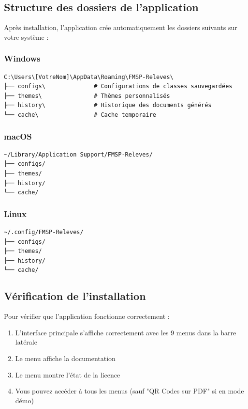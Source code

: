\subsection{Structure des dossiers de l'application}

Après installation, l'application crée automatiquement les dossiers suivants sur votre système :

\subsubsection{Windows}

\begin{verbatim}
C:\Users\[VotreNom]\AppData\Roaming\FMSP-Releves\
├── configs\              # Configurations de classes sauvegardées
├── themes\               # Thèmes personnalisés
├── history\              # Historique des documents générés
└── cache\                # Cache temporaire
\end{verbatim}

\subsubsection{macOS}

\begin{verbatim}
~/Library/Application Support/FMSP-Releves/
├── configs/
├── themes/
├── history/
└── cache/
\end{verbatim}

\subsubsection{Linux}

\begin{verbatim}
~/.config/FMSP-Releves/
├── configs/
├── themes/
├── history/
└── cache/
\end{verbatim}


\subsection{Vérification de l'installation}

Pour vérifier que l'application fonctionne correctement :

\begin{enumerate}[leftmargin=*]
    \item L'interface principale s'affiche correctement avec les 9 menus dans la barre latérale
    \item Le menu \menu{Aide} affiche la documentation
    \item Le menu  montre l'état de la licence
    \item Vous pouvez accéder à tous les menus (sauf "QR Codes sur PDF" si en mode démo)
\end{enumerate}

